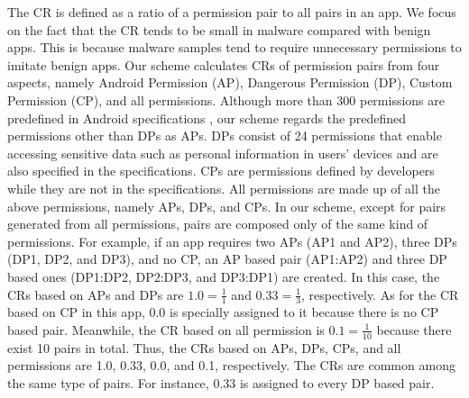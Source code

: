 \documentclass{ieeeaccess}
\begin{document}
The CR is defined as a ratio of a permission pair to all pairs in an app.
We focus on the fact that the CR tends to be small in malware compared with benign apps.
This is because malware samples tend to require unnecessary permissions to imitate benign apps.
Our scheme calculates CRs of permission pairs from four aspects, namely Android Permission (AP), Dangerous Permission (DP), Custom Permission (CP), and all permissions.  
Although more than 300 permissions are predefined in Android specifications \cite{androidpermissionslist}, our scheme regards the predefined permissions other than DPs as APs.
DPs consist of 24 permissions that enable accessing sensitive data such as personal information in users' devices and are also specified in the specifications.
CPs are permissions defined by developers while they are not in the specifications.
All permissions are made up of all the above permissions, namely APs, DPs, and CPs.
In our scheme, except for pairs generated from all permissions, pairs are composed only of the same kind of permissions.
For example, if an app requires two APs (AP1 and AP2), three DPs (DP1, DP2, and DP3), and no CP, an AP based pair (AP1:AP2) and three DP based ones (DP1:DP2, DP2:DP3, and DP3:DP1) are created.
In this case, the CRs based on APs and DPs are $1.0 = \frac{1}{1}$ and $0.33 = \frac{1}{3}$, respectively.  
As for the CR based on CP in this app, 0.0 is specially assigned to it because there is no CP based pair.
Meanwhile, the CR based on all permission is $0.1 = \frac{1}{10}$ because there exist 10 pairs in total.
Thus, the CRs based on APs, DPs, CPs, and all permissions are 1.0, 0.33, 0.0, and 0.1, respectively.
The CRs are common among the same type of pairs.
For instance, 0.33 is assigned to every DP based pair.
\end{document}

